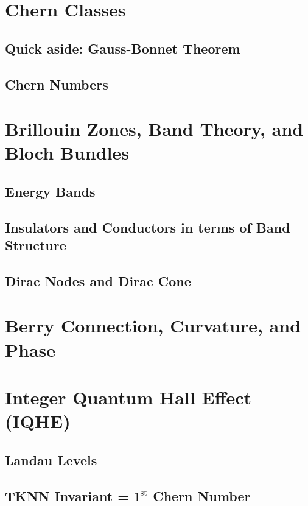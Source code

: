 \documentclass[11pt]{article}
\begin{document}
\pagebreak
\section{Chern Classes}

\subsection{Quick aside: Gauss-Bonnet Theorem}

\subsection{Chern Numbers}

\pagebreak
\section{Brillouin Zones, Band Theory, and Bloch Bundles}

\subsection*{Energy Bands}

\subsection*{Insulators and Conductors in terms of Band Structure}

\subsection{Dirac Nodes and Dirac Cone}

\pagebreak
\section{Berry Connection, Curvature, and Phase}

\pagebreak
\section{Integer Quantum Hall Effect (IQHE)}

\pagebreak
\subsection{Landau Levels}

\pagebreak
\subsection{TKNN Invariant = $1^{\text{st}}$ Chern Number}
\end{document}
